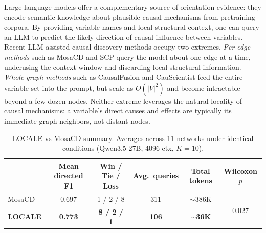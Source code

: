 \documentclass{article} %
\begin{document}
Large language models offer a complementary source of orientation evidence: they encode semantic knowledge about plausible causal mechanisms from pretraining corpora. By providing variable names and local structural context, one can query an LLM to predict the likely direction of causal influence between variables. Recent LLM-assisted causal discovery methods occupy two extremes. \textit{Per-edge methods} such as MosaCD \citep{chen2024mosacd} and SCP \citep{cohrs2024scp} query the model about one edge at a time, underusing the context window and discarding local structural information. \textit{Whole-graph methods} such as CausalFusion \citep{takayama2024causalfusion} and CauScientist \citep{chen2025causcientist} feed the entire variable set into the prompt, but scale as $O(|V|^2)$ and become intractable beyond a few dozen nodes. Neither extreme leverages the natural locality of causal mechanisms: a variable's direct causes and effects are typically its immediate graph neighbors, not distant nodes.

\begin{table}[t]
\centering
\caption{LOCALE vs MosaCD summary. Averages across 11 networks under identical conditions (Qwen3.5-27B, 4096 ctx, $K{=}10$).}
\label{tab:overview}
\small
\begin{tabular}{lccccc}
\toprule
 & Mean directed F1 & Win / Tie / Loss & Avg.\ queries & Total tokens & Wilcoxon $p$ \\
\midrule
MosaCD        & 0.697 & 1 / 2 / 8 & 311 & $\sim$386K & \multirow{2}{*}{0.027} \\
\textbf{LOCALE} & \textbf{0.773} & \textbf{8 / 2 / 1} & \textbf{106} & $\sim$\textbf{36K} & \\
\bottomrule
\end{tabular}
\end{table}
\end{document}
